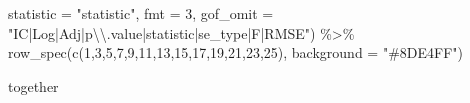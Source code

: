 \documentclass[
  letterpaper,
  DIV=11,
  numbers=noendperiod]{scrartcl}
\newenvironment{Shaded}{\begin{snugshade}}{\end{snugshade}}
\newcommand{\AttributeTok}[1]{\textcolor[rgb]{0.40,0.45,0.13}{#1}}
\newcommand{\DecValTok}[1]{\textcolor[rgb]{0.68,0.00,0.00}{#1}}
\newcommand{\FunctionTok}[1]{\textcolor[rgb]{0.28,0.35,0.67}{#1}}
\newcommand{\NormalTok}[1]{\textcolor[rgb]{0.00,0.23,0.31}{#1}}
\newcommand{\SpecialCharTok}[1]{\textcolor[rgb]{0.37,0.37,0.37}{#1}}
\newcommand{\StringTok}[1]{\textcolor[rgb]{0.13,0.47,0.30}{#1}}
\begin{document}
\begin{Shaded}
\begin{Highlighting}[numbers=left,,]
             \AttributeTok{statistic =} \StringTok{"statistic"}\NormalTok{,}
             \AttributeTok{fmt =}  \DecValTok{3}\NormalTok{,}
             \AttributeTok{gof\_omit =} \StringTok{"IC|Log|Adj|p}\SpecialCharTok{\textbackslash{}\textbackslash{}}\StringTok{.value|statistic|se\_type|F|RMSE"}\NormalTok{) }\SpecialCharTok{\%\textgreater{}\%} 
  \FunctionTok{row\_spec}\NormalTok{(}\FunctionTok{c}\NormalTok{(}\DecValTok{1}\NormalTok{,}\DecValTok{3}\NormalTok{,}\DecValTok{5}\NormalTok{,}\DecValTok{7}\NormalTok{,}\DecValTok{9}\NormalTok{,}\DecValTok{11}\NormalTok{,}\DecValTok{13}\NormalTok{,}\DecValTok{15}\NormalTok{,}\DecValTok{17}\NormalTok{,}\DecValTok{19}\NormalTok{,}\DecValTok{21}\NormalTok{,}\DecValTok{23}\NormalTok{,}\DecValTok{25}\NormalTok{), }\AttributeTok{background =} \StringTok{"\#8DE4FF"}\NormalTok{) }

\NormalTok{together}
\end{Highlighting}
\end{Shaded}
\end{document}

